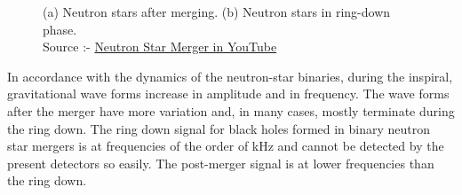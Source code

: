 \begin{figure}[h]
    \centering
    \qquad
    \caption{(a) Neutron stars after merging. (b) Neutron stars in ring-down phase. \\ Source :- \href{https://youtu.be/y8VDwGi0r0E}{Neutron Star Merger in YouTube}} 
\end{figure}

In accordance with the dynamics of the neutron-star binaries, during the inspiral, gravitational wave forms increase in amplitude and in frequency. 
The wave forms after the merger have more variation and, in many cases, mostly terminate during the ring down. The ring down signal for black holes formed in binary neutron star mergers is at frequencies of the order of kHz and cannot be detected by the present detectors so easily. The post-merger signal is at lower frequencies than the ring down.

